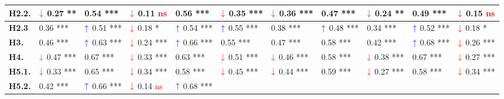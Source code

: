 \begin{table*}
{\begin{tabular}{|l|ll|ll|ll|ll|ll|}
\textbf{H2.2.} &
  \multicolumn{1}{l|}{$\textcolor{red}{\downarrow}$ 0.27 **} &
  0.54 *** &
  \multicolumn{1}{l|}{$\textcolor{red}{\downarrow}$ 0.11 \textcolor{red}{ns}} &
  0.56 *** &
  \multicolumn{1}{l|}{$\textcolor{red}{\downarrow}$ 0.35 ***} &
  $\textcolor{red}{\downarrow}$ 0.36 *** &
  \multicolumn{1}{l|}{0.47 ***} &
  $\textcolor{red}{\downarrow}$ 0.24 ** &
  \multicolumn{1}{l|}{0.49 ***} &
  $\textcolor{red}{\downarrow}$ 0.15 \textcolor{red}{ns} \\ \hline
\textbf{H2.3} &
  \multicolumn{1}{l|}{0.36 ***} &
  $\textcolor{blue}{\uparrow}$ 0.51 *** &
  \multicolumn{1}{l|}{$\textcolor{red}{\downarrow}$ 0.18 *} &
  $\textcolor{blue}{\uparrow}$ 0.54 *** &
  \multicolumn{1}{l|}{$\textcolor{blue}{\uparrow}$ 0.55 ***} &
  0.38 *** &
  \multicolumn{1}{l|}{$\textcolor{blue}{\uparrow}$ 0.48 ***} &
  0.34 *** &
  \multicolumn{1}{l|}{$\textcolor{blue}{\uparrow}$ 0.52 ***} &
  $\textcolor{red}{\downarrow}$ 0.18 * \\ \hline
\textbf{H3.} &
  \multicolumn{1}{l|}{0.46 ***} &
  $\textcolor{blue}{\uparrow}$ 0.63 *** &
  \multicolumn{1}{l|}{$\textcolor{red}{\downarrow}$ 0.24 ***} &
  $\textcolor{blue}{\uparrow}$ 0.66 *** &
  \multicolumn{1}{l|}{0.55 ***} &
  0.47 *** &
  \multicolumn{1}{l|}{0.58 ***} &
  0.42 *** &
  \multicolumn{1}{l|}{$\textcolor{blue}{\uparrow}$ 0.68 ***} &
  $\textcolor{red}{\downarrow}$ 0.26 *** \\ \hline
\textbf{H4.} &
  \multicolumn{1}{l|}{$\textcolor{red}{\downarrow}$ 0.47 ***} &
  0.67 *** &
  \multicolumn{1}{l|}{$\textcolor{red}{\downarrow}$ 0.33 ***} &
  0.63 *** &
  \multicolumn{1}{l|}{$\textcolor{red}{\downarrow}$ 0.51 ***} &
  $\textcolor{red}{\downarrow}$ 0.46 *** &
  \multicolumn{1}{l|}{0.58 ***} &
  $\textcolor{red}{\downarrow}$ 0.38 *** &
  \multicolumn{1}{l|}{0.67 ***} &
  $\textcolor{red}{\downarrow}$ 0.27 *** \\ \hline
\textbf{H5.1.} &
  \multicolumn{1}{l|}{$\textcolor{red}{\downarrow}$ 0.33 ***} &
  0.65 *** &
  \multicolumn{1}{l|}{$\textcolor{red}{\downarrow}$ 0.34 ***} &
  0.58 *** &
  \multicolumn{1}{l|}{$\textcolor{red}{\downarrow}$ 0.45 ***} &
  $\textcolor{red}{\downarrow}$ 0.44 *** &
  \multicolumn{1}{l|}{0.59 ***} &
  $\textcolor{red}{\downarrow}$ 0.27 *** &
  \multicolumn{1}{l|}{0.58 ***} &
  $\textcolor{red}{\downarrow}$ 0.34 *** \\ \hline
\textbf{H5.2.} &
  \multicolumn{1}{l|}{0.42 ***} &
  $\textcolor{blue}{\uparrow}$ 0.66 *** &
  \multicolumn{1}{l|}{$\textcolor{red}{\downarrow}$ 0.14 \textcolor{red}{ns}} &
  $\textcolor{blue}{\uparrow}$ 0.68 *** &

\end{tabular}}
\end{table*}
